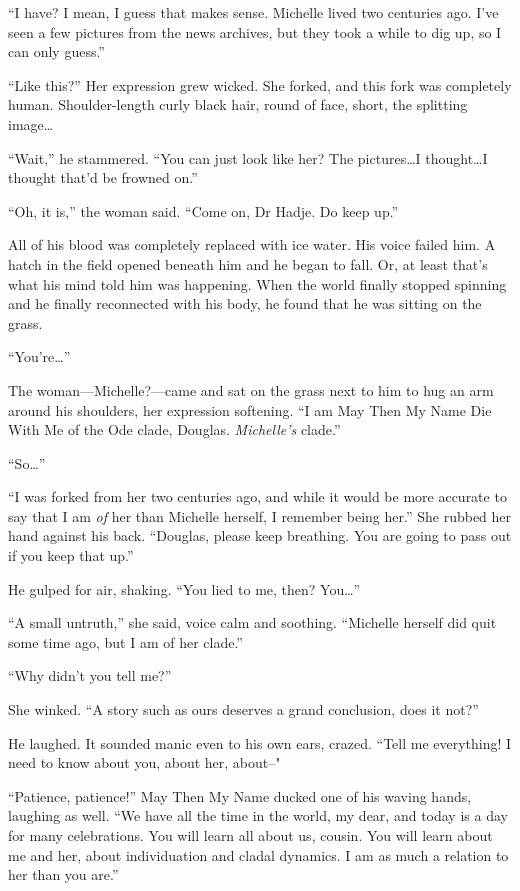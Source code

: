 ``I have? I mean, I guess that makes sense. Michelle lived two centuries ago. I've seen a few pictures from the news archives, but they took a while to dig up, so I can only guess.''

``Like this?'' Her expression grew wicked. She forked, and this fork was completely human. Shoulder-length curly black hair, round of face, short, the splitting image\ldots{}

``Wait,'' he stammered. ``You can just look like her? The pictures\ldots I thought\ldots I thought that'd be frowned on.''

``Oh, it is,'' the woman said. ``Come on, Dr Hadje. Do keep up.''

All of his blood was completely replaced with ice water. His voice failed him. A hatch in the field opened beneath him and he began to fall. Or, at least that's what his mind told him was happening. When the world finally stopped spinning and he finally reconnected with his body, he found that he was sitting on the grass.

``You're\ldots{}''

The woman---Michelle?---came and sat on the grass next to him to hug an arm around his shoulders, her expression softening. ``I am May Then My Name Die With Me of the Ode clade, Douglas. \emph{Michelle's} clade.''

``So\ldots{}''

``I was forked from her two centuries ago, and while it would be more accurate to say that I am \emph{of} her than Michelle herself, I remember being her.'' She rubbed her hand against his back. ``Douglas, please keep breathing. You are going to pass out if you keep that up.''

He gulped for air, shaking. ``You lied to me, then? You\ldots{}''

``A small untruth,'' she said, voice calm and soothing. ``Michelle herself did quit some time ago, but I am of her clade.''

``Why didn't you tell me?''

She winked. ``A story such as ours deserves a grand conclusion, does it not?''

He laughed. It sounded manic even to his own ears, crazed. ``Tell me everything! I need to know about you, about her, about--"

``Patience, patience!'' May Then My Name ducked one of his waving hands, laughing as well. ``We have all the time in the world, my dear, and today is a day for many celebrations. You will learn all about us, cousin. You will learn about me and her, about individuation and cladal dynamics. I am as much a relation to her than you are.''

